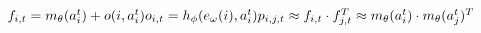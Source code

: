 \documentclass[final]{beamer}
\begin{document}
\begin{frame}[t]
\begin{multicols}{3}
\blindtext[1]

$
f_{i, t}=m_\theta (a_i^t) + o(i, a_i^t) \\
o_{i, t}=h_\phi (e_\omega(i), a_i^t) \\
p_{i, j, t} \approx f_{i, t} \cdot f_{j, t}^T \approx m_\theta (a_i^t) \cdot m_\theta (a_j^t)^T
$

\blindtext[2]

\end{multicols}
\end{frame}
\end{document}
